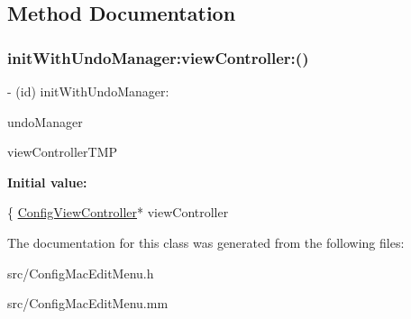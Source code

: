 \subsection{Method Documentation}
\mbox{\label{interfaceConfigEditMenu_a4e4d50ce26c275b2ab20f656d5886dc4}} 
\subsubsection{\texorpdfstring{init\+With\+Undo\+Manager\+:view\+Controller\+:()}{initWithUndoManager:viewController:()}}
{\footnotesize\ttfamily -\/ (id) init\+With\+Undo\+Manager\+: \begin{DoxyParamCaption}\item[{(N\+S\+Undo\+Manager$\ast$)}]{undo\+Manager }\item[{viewController:(\hyperlink{interfaceConfigViewController}{Config\+View\+Controller}$\ast$)}]{view\+Controller\+T\+MP }\end{DoxyParamCaption}}

{\bfseries Initial value\+:}
\begin{DoxyCode}
\{
    \hyperlink{interfaceConfigViewController}{ConfigViewController}* viewController
\end{DoxyCode}


The documentation for this class was generated from the following files\+:\begin{DoxyCompactItemize}
\item 
src/Config\+Mac\+Edit\+Menu.\+h\item 
src/Config\+Mac\+Edit\+Menu.\+mm\end{DoxyCompactItemize}
